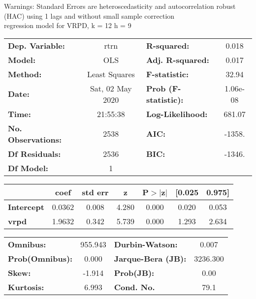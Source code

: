 Warnings: \newline
 [1] Standard Errors are heteroscedasticity and autocorrelation robust (HAC) using 1 lags and without small sample correction\\ 

regression model for VRPD, k = 12 h = 9\begin{center}
\begin{tabular}{lclc}
\toprule
\textbf{Dep. Variable:}    &       rtrn       & \textbf{  R-squared:         } &     0.018   \\
\textbf{Model:}            &       OLS        & \textbf{  Adj. R-squared:    } &     0.017   \\
\textbf{Method:}           &  Least Squares   & \textbf{  F-statistic:       } &     32.94   \\
\textbf{Date:}             & Sat, 02 May 2020 & \textbf{  Prob (F-statistic):} &  1.06e-08   \\
\textbf{Time:}             &     21:55:38     & \textbf{  Log-Likelihood:    } &    681.07   \\
\textbf{No. Observations:} &        2538      & \textbf{  AIC:               } &    -1358.   \\
\textbf{Df Residuals:}     &        2536      & \textbf{  BIC:               } &    -1346.   \\
\textbf{Df Model:}         &           1      & \textbf{                     } &             \\
\bottomrule
\end{tabular}
\begin{tabular}{lcccccc}
                   & \textbf{coef} & \textbf{std err} & \textbf{z} & \textbf{P$> |$z$|$} & \textbf{[0.025} & \textbf{0.975]}  \\
\midrule
\textbf{Intercept} &       0.0362  &        0.008     &     4.280  &         0.000        &        0.020    &        0.053     \\
\textbf{vrpd}      &       1.9632  &        0.342     &     5.739  &         0.000        &        1.293    &        2.634     \\
\bottomrule
\end{tabular}
\begin{tabular}{lclc}
\textbf{Omnibus:}       & 955.943 & \textbf{  Durbin-Watson:     } &    0.007  \\
\textbf{Prob(Omnibus):} &   0.000 & \textbf{  Jarque-Bera (JB):  } & 3236.300  \\
\textbf{Skew:}          &  -1.914 & \textbf{  Prob(JB):          } &     0.00  \\
\textbf{Kurtosis:}      &   6.993 & \textbf{  Cond. No.          } &     79.1  \\
\bottomrule
\end{tabular}
\end{center}

